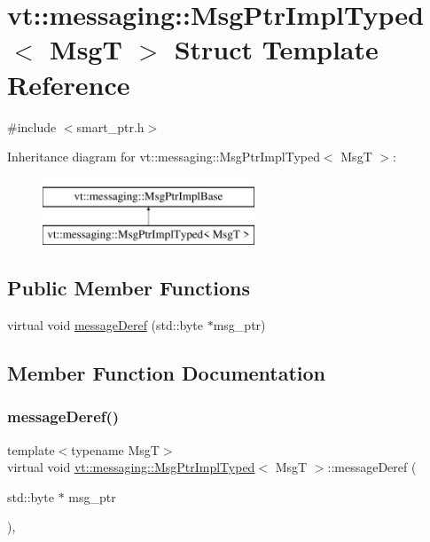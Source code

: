 \hypertarget{structvt_1_1messaging_1_1_msg_ptr_impl_typed}{}\section{vt\+:\+:messaging\+:\+:Msg\+Ptr\+Impl\+Typed$<$ MsgT $>$ Struct Template Reference}
\label{structvt_1_1messaging_1_1_msg_ptr_impl_typed}


{\ttfamily \#include $<$smart\+\_\+ptr.\+h$>$}

Inheritance diagram for vt\+:\+:messaging\+:\+:Msg\+Ptr\+Impl\+Typed$<$ MsgT $>$\+:\begin{figure}[H]
\begin{center}
\leavevmode
\includegraphics[height=2.000000cm]{structvt_1_1messaging_1_1_msg_ptr_impl_typed}
\end{center}
\end{figure}
\subsection*{Public Member Functions}
\begin{DoxyCompactItemize}
\item 
virtual void \hyperlink{structvt_1_1messaging_1_1_msg_ptr_impl_typed_abb63f6d84ef154dfb315e9ed25775c15}{message\+Deref} (std\+::byte $\ast$msg\+\_\+ptr)
\end{DoxyCompactItemize}


\subsection{Member Function Documentation}
\mbox{\label{structvt_1_1messaging_1_1_msg_ptr_impl_typed_abb63f6d84ef154dfb315e9ed25775c15}} 
\subsubsection{\texorpdfstring{message\+Deref()}{messageDeref()}}
{\footnotesize\ttfamily template$<$typename MsgT$>$ \\
virtual void \hyperlink{structvt_1_1messaging_1_1_msg_ptr_impl_typed}{vt\+::messaging\+::\+Msg\+Ptr\+Impl\+Typed}$<$ MsgT $>$\+::message\+Deref (\begin{DoxyParamCaption}\item[{std\+::byte $\ast$}]{msg\+\_\+ptr }\end{DoxyParamCaption})\hspace{0.3cm}{\ttfamily [inline]}, {\ttfamily [virtual]}}

